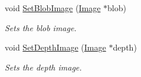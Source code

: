 \begin{DoxyCompactItemize}
void \hyperlink{classFindRobot_a63e77c7b9a876332fc3fb411bb6644a9}{Set\+Blob\+Image} (\hyperlink{classImage}{Image} $\ast$blob)
\begin{DoxyCompactList}\small\item\em Sets the blob image. \end{DoxyCompactList}\item 
\mbox{\label{classFindRobot_a1aac26d16ab0e8ffc3fd1c587b96991e}} 
void \hyperlink{classFindRobot_a1aac26d16ab0e8ffc3fd1c587b96991e}{Set\+Depth\+Image} (\hyperlink{classImage}{Image} $\ast$depth)
\begin{DoxyCompactList}\small\item\em Sets the depth image. \end{DoxyCompactList}\end{DoxyCompactItemize}
